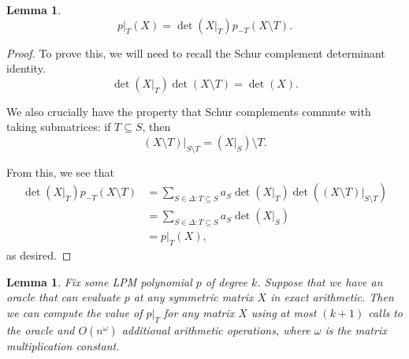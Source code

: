 \documentclass{amsart}
\newtheorem{lemma}[theorem]{Lemma}
\theoremstyle{definition}
\begin{document}
\begin{lemma}
    \label{lem:schurCompCond}
    \[
        p|_T(X) = \det(X|_T) p_{-T}(X \setminus T).
    \]
\end{lemma}
\begin{proof}
    To prove this, we will need to recall the Schur complement determinant identity.
    \[
    \det(X|_T) \det(X \setminus T) = \det(X).
    \]

    We also crucially have the property that Schur complements commute with taking submatrices: if $T \subseteq S$, then
    \[
        (X \setminus T)|_{S \setminus T} = (X|_S)\setminus T.
    \]

    From this, we see that 
    \begin{align*} 
    \det(X|_T) p_{-T}(X \setminus T)&=\sum_{S \in \Delta : T \subseteq S} a_S \det(X|_T)\det((X \setminus T)|_{S\setminus T})\\
            &=\sum_{S \in \Delta : T \subseteq S} a_S \det(X|_S)\\
            &=p|_T(X),
    \end{align*}
    as desired.

\end{proof}
\begin{lemma}
    \label{lem:new_oracle}
    Fix some LPM polynomial $p$ of degree $k$.
    Suppose that we have an oracle that can evaluate $p$ at any symmetric matrix $X$ in exact arithmetic.
    Then we can compute the value of $p|_T$ for any matrix $X$ using at most $(k+1)$ calls to the oracle and $O(n^{\omega})$ additional arithmetic operations, where $\omega$ is the matrix multiplication constant.
\end{lemma}
\end{document}
